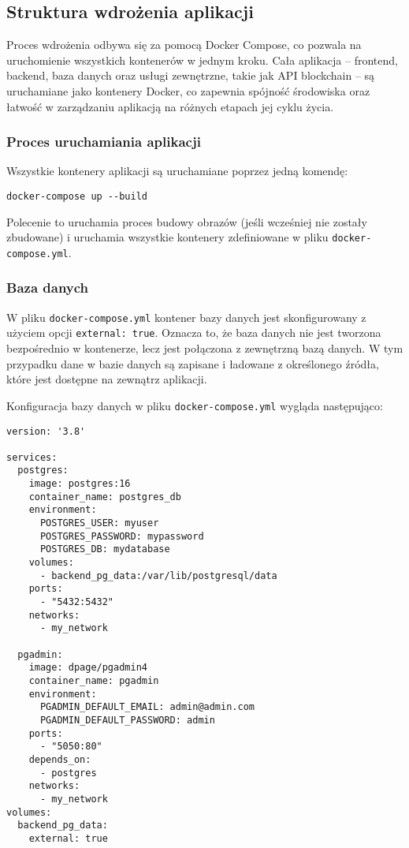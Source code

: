 \subsection{Struktura wdrożenia aplikacji}

Proces wdrożenia odbywa się za pomocą Docker Compose, co pozwala na uruchomienie wszystkich kontenerów w jednym kroku. Cała aplikacja – frontend, backend, baza danych oraz usługi zewnętrzne, takie jak API blockchain – są uruchamiane jako kontenery Docker, co zapewnia spójność środowiska oraz łatwość w zarządzaniu aplikacją na różnych etapach jej cyklu życia.

\subsubsection{Proces uruchamiania aplikacji}

Wszystkie kontenery aplikacji są uruchamiane poprzez jedną komendę:

\begin{lstlisting}
docker-compose up --build
\end{lstlisting}

Polecenie to uruchamia proces budowy obrazów (jeśli wcześniej nie zostały zbudowane) i uruchamia wszystkie kontenery zdefiniowane w pliku \texttt{docker-compose.yml}.

\subsubsection{Baza danych}

W pliku \texttt{docker-compose.yml} kontener bazy danych jest skonfigurowany z użyciem opcji \texttt{external: true}. Oznacza to, że baza danych nie jest tworzona bezpośrednio w kontenerze, lecz jest połączona z zewnętrzną bazą danych. W tym przypadku dane w bazie danych są zapisane i ładowane z określonego źródła, które jest dostępne na zewnątrz aplikacji.

Konfiguracja bazy danych w pliku \texttt{docker-compose.yml} wygląda następująco:

\begin{lstlisting}
version: '3.8'

services:
  postgres:
    image: postgres:16
    container_name: postgres_db
    environment:
      POSTGRES_USER: myuser
      POSTGRES_PASSWORD: mypassword
      POSTGRES_DB: mydatabase
    volumes:
      - backend_pg_data:/var/lib/postgresql/data
    ports:
      - "5432:5432"
    networks:
      - my_network

  pgadmin:
    image: dpage/pgadmin4
    container_name: pgadmin
    environment:
      PGADMIN_DEFAULT_EMAIL: admin@admin.com
      PGADMIN_DEFAULT_PASSWORD: admin
    ports:
      - "5050:80"
    depends_on:
      - postgres
    networks:
      - my_network
volumes:
  backend_pg_data:
    external: true
\end{lstlisting}

